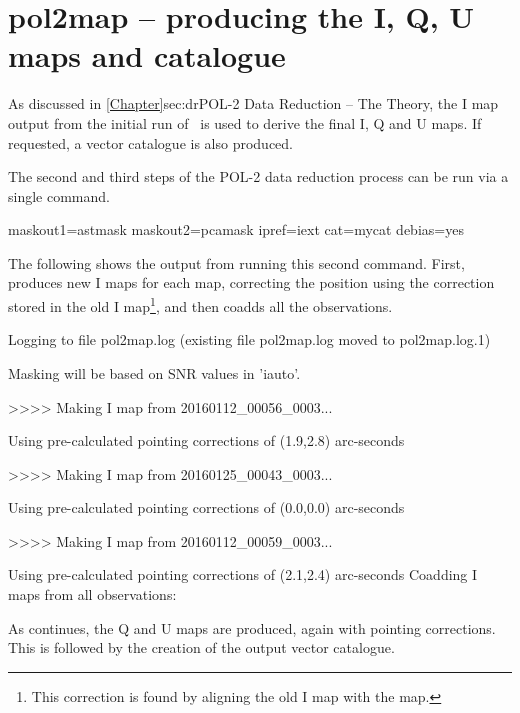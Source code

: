 \section{pol2map -- producing the I, Q, U maps and catalogue}
\label{sec:how-step23}

As discussed in \cref{Chapter}{sec:dr}{POL-2 Data Reduction -- The
  Theory}, the I map output from the initial run of \poltwomap\ is used to
derive the final I, Q and U maps. If requested, a vector catalogue is
also produced.

The second and third steps of the POL-2 data reduction process can be
run via a single command.

\begin{terminalv}
          maskout1=astmask maskout2=pcamask ipref=iext cat=mycat debias=yes
\end{terminalv}

The following shows the output from running this second 
command. First,  produces new I maps for each map, correcting
the position using the correction stored in the old I
map\footnote{This correction is found by aligning the old I map with the
 map.}, and then coadds all the observations.

\begin{terminalv}
Logging to file pol2map.log
(existing file pol2map.log moved to pol2map.log.1)

Masking will be based on SNR values in 'iauto'.

>>>>   Making I map from 20160112_00056_0003...

   Using pre-calculated pointing corrections of (1.9,2.8) arc-seconds

>>>>   Making I map from 20160125_00043_0003...

   Using pre-calculated pointing corrections of (0.0,0.0) arc-seconds

>>>>   Making I map from 20160112_00059_0003...

   Using pre-calculated pointing corrections of (2.1,2.4) arc-seconds
Coadding I maps from all observations:
\end{terminalv}

As  continues, the Q and U maps are produced, again with
pointing corrections. This is followed by the creation of the output
vector catalogue.

